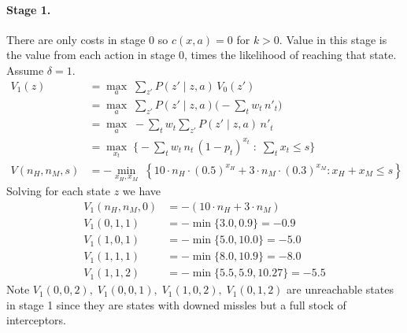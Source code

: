 \documentclass[11pt]{exam}
\begin{document}
\begin{questions}
\begin{parts}
        \paragraph{Stage 1.} There are only costs in stage 0 so $c(x,a) = 0$ for $k > 0$. Value in this stage is the value from each action in stage 0, times the likelihood of reaching that state. Assume $\delta=1$.
        \begin{align*}
            V_1(z) &= \max_a\; \sum_{z'}P(z'\mid z,a)\,V_0(z')\\
            &= \max_a\; \sum_{z'}P(z'\mid z,a)\Big(-\sum_t w_t\, n'_t\Big)\\
            &= \max_a\; -\sum_t w_t \sum_{z'}P(z'\mid z,a)\, n'_t\\
            &= \max_{x_t}\;\Big\{ -\sum_t w_t\, n_t\,(1-p_t)^{x_t}\;:\; \sum_{t}x_t \leq s\Big\}\\
            V(n_H, n_M, s) &= -\min_{x_H,x_M}\;\left\{10 \cdot n_{H} \cdot (0.5)^{x_H}+ 3\cdot n_{M}\cdot (0.3)^{x_M} :x_H + x_M \leq s \right\}
        \end{align*}
        Solving for each state $z$ we have
        \begin{align*}
            V_1(n_H,n_M,0) &= -(10\cdot n_H + 3\cdot n_M)\\
            V_1(0,1,1) &= -\min\{3.0, 0.9\} = -0.9\\
            V_1(1,0,1) &= -\min\{5.0, 10.0\} = -5.0\\
            V_1(1,1,1) &= -\min\{8.0, 10.9\} = -8.0\\
            V_1(1,1,2) &= -\min\{5.5, 5.9, 10.27\} = -5.5
        \end{align*}
        Note $V_1(0,0,2),\; V_1(0,0,1),\; V_1(1,0,2),\; V_1(0,1,2)$ are unreachable states in stage 1 since they are states with downed missles but a full stock of interceptors.


\end{parts}
\end{questions}
\end{document}
